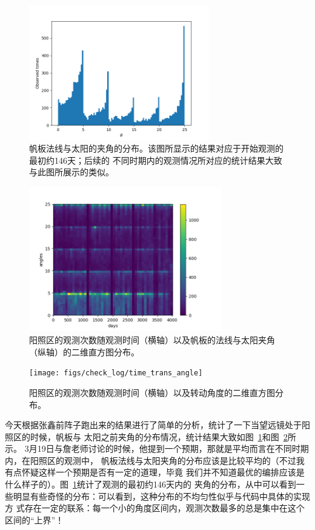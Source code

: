 \begin{figure}
\centering
\includegraphics[width=0.7\textwidth]{figs/check_log/fig_0.png}
\caption{帆板法线与太阳的夹角的分布。该图所显示的结果对应于开始观测的最初约146天；后续的
不同时期内的观测情况所对应的统计结果大致与此图所展示的类似。}
\label{0321_hist1d}
\end{figure}

\begin{figure}
\centering
\includegraphics[width=0.75\textwidth]{figs/check_log/time_angle_hist2d.png}
\caption{阳照区的观测次数随观测时间（横轴）以及帆板的法线与太阳夹角（纵轴）的二维直方图分布。}
\label{0321_hist2d_A}
\end{figure}


\begin{figure}
\centering
\texttt{[image: figs/check\_log/time\_trans\_angle]}
\caption{阳照区的观测次数随观测时间（横轴）以及转动角度的二维直方图分布。}
\label{0321_hist2d_B}
\end{figure}

今天根据张鑫前阵子跑出来的结果进行了简单的分析，统计了一下当望远镜处于阳照区的时候，帆板与
太阳之前夹角的分布情况，统计结果大致如图~\ref{0321_hist1d}和图~\ref{0321_hist2d_A}所示。
3月19日与詹老师讨论的时候，他提到一个预期，那就是平均而言在不同时期内，在阳照区的观测中，
帆板法线与太阳夹角的分布应该是比较平均的（不过我有点怀疑这样一个预期是否有一定的道理，毕竟
我们并不知道最优的编排应该是什么样子的）。图~\ref{0321_hist1d}统计了观测的最初约146天内的
夹角的分布，从中可以看到一些明显有些奇怪的分布：可以看到，这种分布的不均匀性似乎与代码中具体的实现方
式存在一定的联系：每一个小的角度区间内，观测次数最多的总是集中在这个区间的“上界”！

